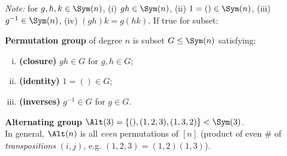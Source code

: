 \begin{slide}
    \textit{Note:} for $g,h,k \in \Sym(n)$, (i) $gh \in \Sym(n)$, (ii) $1 = () \in \Sym(n)$, (iii) $g^{-1} \in \Sym(n)$, (iv) $(gh)k = g(hk)$. If true for subset:

    \begin{definition}
        \vspace{0pt}
        \textbf{Permutation group} of degree $n$ is subset $G \leq \Sym(n)$ satisfying:
        \begin{enumerate}[(i)]
            \item \textbf{(closure)} $gh \in G$ for $g,h \in G$; \pause
            \item \textbf{(identity)} $1 = () \in G$; \pause
            \item \textbf{(inverses)} $g^{-1} \in G$ for $g \in G$.
        \end{enumerate}
    \end{definition}

    \begin{example}
        \vspace{0pt}
        \textbf{Alternating group} $\Alt(3) = \{(),(1,2,3),(1,3,2)\} < \Sym(3)$. \\
        In general, $\Alt(n)$ is all \textit{even} permutations of $[n]$ (product of even \# of \textit{transpositions} $(i,j)$, e.g. $(1,2,3) = (1,2)(1,3)$).
    \end{example}
\end{slide}



